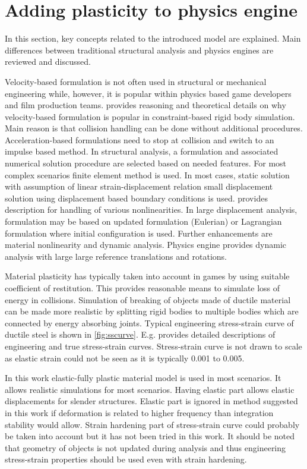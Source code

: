 \section{Adding plasticity to physics engine}

In this section, key concepts related to the introduced model are explained. Main differences between 
traditional structural analysis and physics engines are reviewed and discussed.

Velocity-based formulation is not often used in structural or mechanical engineering while, 
however, it is popular within physics based game developers and film production teams.
 \citet[p.~45]{erleben.thesis} provides reasoning and theoretical details on why 
velocity-based formulation is  popular in constraint-based rigid body simulation. 
Main reason is that collision handling can be done without additional procedures.
Acceleration-based formulations need to stop at collision and switch to an impulse based method.
In structural analysis, a formulation and associated numerical solution procedure are selected 
based on needed features.
For most complex scenarios finite element method is used.
In most cases, static solution with assumption of linear strain-displacement relation small 
displacement solution using displacement based boundary conditions is used.
\citet{bathe-1975} provides description for handling of various nonlinearities.
In large displacement analysis, formulation may be based on updated formulation (Eulerian) or
Lagrangian formulation where initial configuration is used.
Further enhancements are material nonlinearity and dynamic analysis.
Physics engine provides dynamic analysis with large large reference translations and rotations.

Material plasticity has typically taken into account in games by using suitable coefficient of restitution.
This provides reasonable means to simulate loss of energy in collisions.
Simulation of breaking of objects made of ductile material can be made more realistic by splitting rigid bodies
to multiple bodies which are connected by energy absorbing joints.
Typical engineering stress-strain curve of ductile steel is shown in \ref{fig:sscurve}.
E.g. \citet{dowling} provides detailed descriptions of engineering and true stress-strain curves.
Stress-strain curve is not drawn to scale as elastic strain could not be seen as it is typically 0.001 to 0.005.

In this work elastic-fully plastic material model is used in most scenarios.
It allows realistic simulations for most scenarios.
Having elastic part allows elastic displacements for slender structures. 
Elastic part is ignored in method suggested in this work if deformation is related
to higher frequency than integration stability would allow.
Strain hardening part of stress-strain curve could probably be taken into account but it has not been tried in this work.
It should be noted that geometry
of objects is not updated during analysis and thus engineering stress-strain properties should
be used even with strain hardening.

